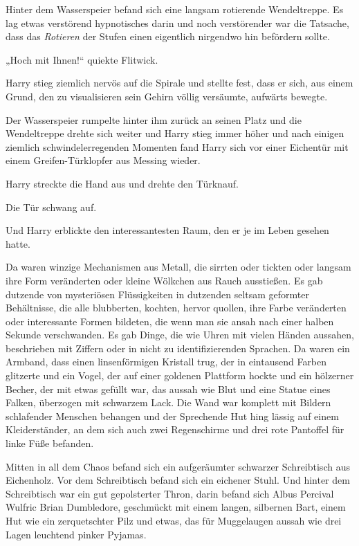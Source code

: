 {Hinter dem Wasserspeier befand sich eine langsam rotierende Wendeltreppe. Es lag etwas verstörend hypnotisches darin und noch verstörender war die Tatsache, dass das \emph{Rotieren} der Stufen einen eigentlich nirgendwo hin befördern sollte.

„Hoch mit Ihnen!“ quiekte Flitwick.

Harry stieg ziemlich nervös auf die Spirale und stellte fest, dass er sich, aus einem Grund, den zu visualisieren sein Gehirn völlig versäumte, aufwärts bewegte.

Der Wasserspeier rumpelte hinter ihm zurück an seinen Platz und die Wendeltreppe drehte sich weiter und Harry stieg immer höher und nach einigen ziemlich schwindelerregenden Momenten fand Harry sich vor einer Eichentür mit einem Greifen-Türklopfer aus Messing wieder.

Harry streckte die Hand aus und drehte den Türknauf.

Die Tür schwang auf.

Und Harry erblickte den interessantesten Raum, den er je im Leben gesehen hatte.

Da waren winzige Mechanismen aus Metall, die sirrten oder tickten oder langsam ihre Form veränderten oder kleine Wölkchen aus Rauch ausstießen. Es gab dutzende von mysteriösen Flüssigkeiten in dutzenden seltsam geformter Behältnisse, die alle blubberten, kochten, hervor quollen, ihre Farbe veränderten oder interessante Formen bildeten, die wenn man sie ansah nach einer halben Sekunde verschwanden. Es gab Dinge, die wie Uhren mit vielen Händen aussahen, beschrieben mit Ziffern oder in nicht zu identifizierenden Sprachen. Da waren ein Armband, dass einen linsenförmigen Kristall trug, der in eintausend Farben glitzerte und ein Vogel, der auf einer goldenen Plattform hockte und ein hölzerner Becher, der mit etwas gefüllt war, das aussah wie Blut und eine Statue eines Falken, überzogen mit schwarzem Lack. Die Wand war komplett mit Bildern schlafender Menschen behangen und der Sprechende Hut hing lässig auf einem Kleiderständer, an dem sich auch zwei Regenschirme und drei rote Pantoffel für linke Füße befanden.

Mitten in all dem Chaos befand sich ein aufgeräumter schwarzer Schreibtisch aus Eichenholz. Vor dem Schreibtisch befand sich ein eichener Stuhl. Und hinter dem Schreibtisch war ein gut gepolsterter Thron, darin befand sich Albus Percival Wulfric Brian Dumbledore, geschmückt mit einem langen, silbernen Bart, einem Hut wie ein zerquetschter Pilz und etwas, das für Muggelaugen aussah wie drei Lagen leuchtend pinker Pyjamas.

}
